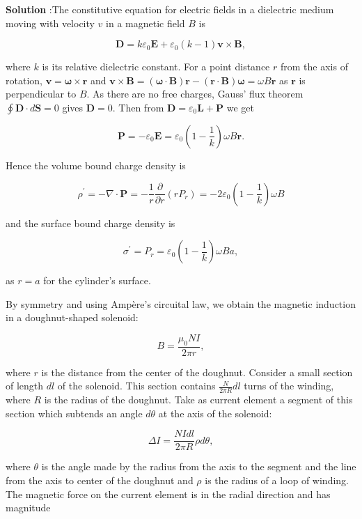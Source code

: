 \documentclass[10pt]{article}
\begin{document}
\textbf{Solution} :The constitutive equation for electric fields in a dielectric medium moving with velocity $v$ in a magnetic field $B$ is

$$
\mathbf{D}=k \varepsilon_{0} \mathbf{E}+\varepsilon_{0}(k-1) \mathbf{v} \times \mathbf{B},
$$

where $k$ is its relative dielectric constant. For a point distance $r$ from the axis of rotation, $\mathbf{v}=\boldsymbol{\omega} \times \mathbf{r}$ and $\mathbf{v} \times \mathbf{B}=(\boldsymbol{\omega} \cdot \mathbf{B}) \mathbf{r}-(\mathbf{r} \cdot \mathbf{B}) \boldsymbol{\omega}=\omega B \mathbf{r}$ as $\mathbf{r}$ is perpendicular to $B$. As there are no free charges, Gauss' flux theorem $\oint \mathbf{D} \cdot d \mathbf{S}=0$ gives $\mathbf{D}=0$. Then from $\mathbf{D}=\varepsilon_{0} \mathbf{L}+\mathbf{P}$ we get

$$
\mathbf{P}=-\varepsilon_{0} \mathbf{E}=\varepsilon_{0}\left(1-\frac{1}{k}\right) \omega B \mathbf{r} .
$$

Hence the volume bound charge density is

$$
\rho^{\prime}=-\nabla \cdot \mathbf{P}=-\frac{1}{r} \frac{\partial}{\partial r}\left(r P_{r}\right)=-2 \varepsilon_{0}\left(1-\frac{1}{k}\right) \omega B
$$

and the surface bound charge density is

$$
\sigma^{\prime}=P_{r}=\varepsilon_{0}\left(1-\frac{1}{k}\right) \omega B a,
$$

as $r=a$ for the cylinder's surface.

 By symmetry and using Ampère's circuital law, we obtain the magnetic induction in a doughnut-shaped solenoid:

$$
B=\frac{\mu_{0} N I}{2 \pi r},
$$

where $r$ is the distance from the center of the doughnut. Consider a small section of length $d l$ of the solenoid. This section contains $\frac{N}{2 \pi R} d l$ turns of the winding, where $R$ is the radius of the doughnut. Take as current element a segment of this section which subtends an angle $d \theta$ at the axis of the solenoid:

$$
\Delta I=\frac{N I d l}{2 \pi R} \rho d \theta,
$$

where $\theta$ is the angle made by the radius from the axis to the segment and the line from the axis to center of the doughnut and $\rho$ is the radius of a loop of winding. The magnetic force on the current element is in the radial direction and has magnitude
\end{document}
